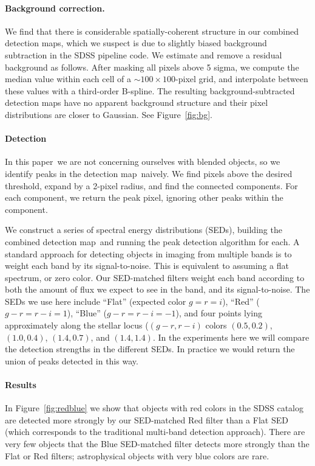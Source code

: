 \documentclass[letterpaper,preprint]{aastex}
\newcommand{\doctype}{paper}
\newcommand{\fig}{Figure}
\newcommand{\figref}[1]{\mbox{\fig~\ref{#1}}}
\newcommand{\detmap}{detection map}
\begin{document}

\paragraph{Background correction.}
We find that there is considerable spatially-coherent structure in our
combined \detmap s, which we suspect is due to slightly biased
background subtraction in the SDSS pipeline code.  We estimate and
remove a residual background as follows.  After masking all pixels
above 5 sigma, we compute the
median value within each cell of a $\sim 100 \times 100$-pixel grid,
and interpolate between these values with a third-order B-spline.  The
resulting background-subtracted \detmap s have no apparent background
structure and their pixel distributions are closer to Gaussian.  See
\figref{fig:bg}.

\paragraph{Detection}
In this \doctype\ we are not concerning ourselves with blended
objects, so we identify peaks in the \detmap\ naively.  We find
pixels above the desired threshold, expand by a 2-pixel radius, and
find the connected components.  For each component, we return the peak
pixel, ignoring other peaks within the component.


We construct a series of spectral energy distributions (SEDs),
building the combined \detmap\ and running the peak detection
algorithm for each.  A standard approach for detecting objects in
imaging from multiple bands is to weight each band by its
signal-to-noise.  This is equivalent to assuming a flat spectrum, or
zero color.  Our SED-matched filters weight each band according to
both the amount of flux we expect to see in the band, and its
signal-to-noise.  The SEDs we use here include ``Flat'' (expected
color $g = r = i$), ``Red'' ($g-r = r-i = 1$), ``Blue'' ($g-r = r-i =
-1$), and four points lying approximately along the stellar locus
($(g-r, r-i)$ colors $(0.5,0.2)$, $(1.0,0.4)$, $(1.4,0.7)$, and
$(1.4,1.4)$.  In the experiments here we will compare the detection
strengths in the different SEDs.  In practice we would return the
union of peaks detected in this way.




\paragraph{Results}
In \figref{fig:redblue} we show that objects with red colors in the
SDSS catalog are detected more strongly by our SED-matched Red filter
than a Flat SED (which corresponds to the traditional multi-band
detection approach).  There are very few objects that the Blue
SED-matched filter detects more strongly than the Flat or Red filters;
astrophysical objects with very blue colors are rare.
\end{document}
